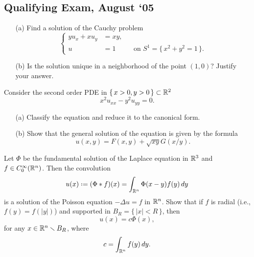 \subsection{Qualifying Exam, August `05}
\begin{problem}
  \hfill
  \begin{itemize}[noitemsep]
  \item[(a)] Find a solution of the Cauchy problem
    \[
      \left\{
        \begin{aligned}
          yu_x+xu_y&=xy,\\
          u&=1&&\text{on \(S^1=\bigl\{\,x^2+y^2=1\,\bigr\}\)}.
        \end{aligned}
      \right.
    \]
  \item[(b)] Is the solution unique in a neighborhood of the point
    \((1,0)\)? Justify your answer.
  \end{itemize}
\end{problem}
\begin{solution*}
\end{solution*}

\begin{problem}
  Consider the second order PDE in \(\{\,x>0,y>0\,\}\subset\mathbb{R}^2\)
  \[
    x^2u_{xx}-y^2u_{yy}=0.
  \]
  \begin{itemize}[noitemsep]
  \item[(a)] Classify the equation and reduce it to the canonical form.
  \item[(b)] Show that the general solution of the equation is given by the
    formula
    \[
      u(x,y)=F(x,y)+\sqrt{xy}G(x/y).
    \]
  \end{itemize}
\end{problem}
\begin{solution*}
\end{solution*}

\begin{problem}
  Let \(\Phi\) be the fundamental solution of the Laplace equation in
  \(\mathbb{R}^3\) and \(f\in C_0^\infty(\mathbb{R}^n)\). Then the convolution
  \[
    u(x)\defeq(\Phi*f)(x)=\int_{\bbR^n}\Phi(x-y)f(y)\diff y
  \]
  is a solution of the Poisson equation \(-\Delta u=f\) in \(\mathbb{R}^n\). Show
  that if \(f\) is radial (i.e., \(f(y)=f(|y|)\)) and supported in
  \(B_R=\{\,|x|<R\,\}\), then
  \[
    u(x)=c\Phi(x),
  \]
  for any \(x\in\mathbb{R}^n\smallsetminus B_R\), where
  \[
    c=\int_{\mathbb{R}^n}f(y)\mathop{}\!d y.
  \]

\end{problem}
\begin{solution*}
\end{solution*}

